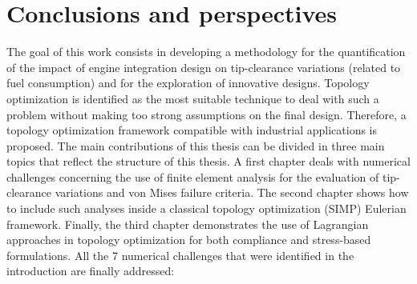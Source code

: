 \chapter{Conclusions and perspectives}
\label{chap:4}
The goal of this work consists in developing a methodology for the quantification of the impact of engine integration design on tip-clearance variations (related to fuel consumption) and for the exploration of innovative designs. Topology optimization is identified as the most suitable technique to deal with such a problem without making too strong assumptions on the final design.
Therefore, a topology optimization framework compatible with industrial applications is proposed. The main contributions of this thesis can be divided in three main topics that reflect the structure of this thesis. A first chapter deals with numerical challenges concerning the use of finite element analysis for the evaluation of tip-clearance variations and von Mises failure criteria. The second chapter shows how to include such analyses inside a classical topology optimization (SIMP) Eulerian framework. Finally, the third chapter demonstrates the use of Lagrangian approaches in topology optimization for both compliance and stress-based formulations.
All the 7 numerical challenges that were identified in the introduction are finally addressed:
